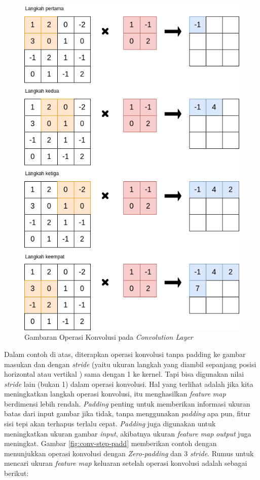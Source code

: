 \begin{figure}[h!]
	\centering
	\includegraphics[scale=0.23]{gambar/langkah-konvolusi.png}
	\caption{Gambaran Operasi Konvolusi pada \textit{Convolution Layer}}
	\label{fig:conv-step}
\end{figure}

Dalam contoh di atas, diterapkan operasi konvolusi tanpa padding ke gambar masukan dan dengan \textit{stride} (yaitu ukuran langkah yang diambil sepanjang posisi horizontal atau vertikal ) sama dengan 1 ke kernel. Tapi bisa digunakan nilai \textit{stride} lain (bukan 1) dalam operasi konvolusi. Hal yang terlihat adalah jika kita meningkatkan langkah operasi konvolusi, itu menghasilkan \textit{feature map} berdimensi lebih rendah. \textit{Padding} penting untuk memberikan informasi ukuran batas dari input gambar jika tidak, tanpa menggunakan \textit{padding} apa pun, fitur sisi tepi akan terhapus terlalu cepat. \textit{Padding} juga digunakan untuk meningkatkan ukuran gambar \textit{input}, akibatnya ukuran \textit{feature map} \textit{output} juga meningkat. Gambar \ref{fig:conv-step-padd} memberikan contoh dengan menunjukkan operasi konvolusi dengan \textit{Zero-padding} dan 3 \textit{stride}. Rumus untuk mencari ukuran \textit{feature map} keluaran setelah operasi konvolusi adalah sebagai berikut:

